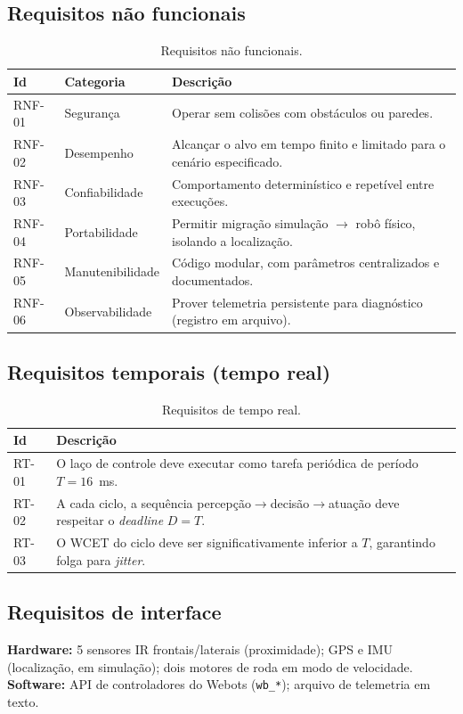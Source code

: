 \subsection{Requisitos não funcionais}
\begin{table}[H]\centering
\caption{Requisitos não funcionais.}
\renewcommand{\arraystretch}{1.2}
\begin{tabularx}{\textwidth}{@{}l l X@{}}
\toprule
\textbf{Id} & \textbf{Categoria} & \textbf{Descrição} \\
\midrule
RNF-01 & Segurança & Operar sem colisões com obstáculos ou paredes. \\
RNF-02 & Desempenho & Alcançar o alvo em tempo finito e limitado para o cenário especificado. \\
RNF-03 & Confiabilidade & Comportamento determinístico e repetível entre execuções. \\
RNF-04 & Portabilidade & Permitir migração simulação $\to$ robô físico, isolando a localização. \\
RNF-05 & Manutenibilidade & Código modular, com parâmetros centralizados e documentados. \\
RNF-06 & Observabilidade & Prover telemetria persistente para diagnóstico (registro em arquivo). \\
\bottomrule
\end{tabularx}
\end{table}

\subsection{Requisitos temporais (tempo real)}
\begin{table}[H]\centering
\caption{Requisitos de tempo real.}
\renewcommand{\arraystretch}{1.2}
\begin{tabularx}{\textwidth}{@{}l X@{}}
\toprule
\textbf{Id} & \textbf{Descrição} \\
\midrule
RT-01 & O laço de controle deve executar como tarefa periódica de período $T=16$~ms. \\
RT-02 & A cada ciclo, a sequência percepção$\to$decisão$\to$atuação deve respeitar o \emph{deadline} $D=T$. \\
RT-03 & O WCET do ciclo deve ser significativamente inferior a $T$, garantindo folga para \emph{jitter}. \\
\bottomrule
\end{tabularx}
\end{table}

\subsection{Requisitos de interface}
\textbf{Hardware:} 5 sensores IR frontais/laterais (proximidade); GPS e IMU (localização, em simulação); dois motores de roda em modo de velocidade. \textbf{Software:} API de controladores do Webots (\texttt{wb\_*}); arquivo de telemetria em texto.

